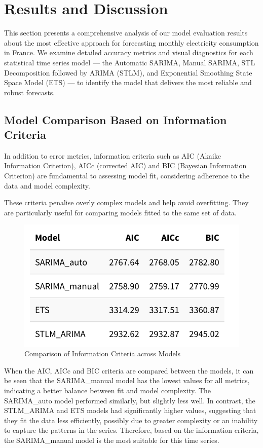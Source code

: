 \section{Results and Discussion}

This section presents a comprehensive analysis of our model evaluation results about the most effective approach for forecasting monthly electricity consumption in France. We examine detailed accuracy metrics and visual diagnostics for each statistical time series model — the Automatic SARIMA, Manual SARIMA, STL Decomposition followed by ARIMA (STLM), and Exponential Smoothing State Space Model (ETS) — to identify the model that delivers the most reliable and robust forecasts.

\subsection{Model Comparison Based on Information Criteria}


In addition to error metrics, information criteria such as AIC (Akaike Information Criterion), AICc (corrected AIC) and BIC (Bayesian Information Criterion) are fundamental to assessing model fit, considering adherence to the data and model complexity.

These criteria penalise overly complex models and help avoid overfitting. They are particularly useful for comparing models fitted to the same set of data.

\begin{figure}[H]
    \centering
    \includegraphics[width=0.75\linewidth]{images/table1.png}
    \caption{Comparison of Information Criteria across Models}
    \label{fig:enter-label}
\end{figure}

When the AIC, AICc and BIC criteria are compared between the models, it can be seen that the SARIMA\_manual model has the lowest values for all metrics, indicating a better balance between fit and model complexity. The SARIMA\_auto model performed similarly, but slightly less well. In contrast, the STLM\_ARIMA and ETS models had significantly higher values, suggesting that they fit the data less efficiently, possibly due to greater complexity or an inability to capture the patterns in the series. Therefore, based on the information criteria, the SARIMA\_manual model is the most suitable for this time series.

